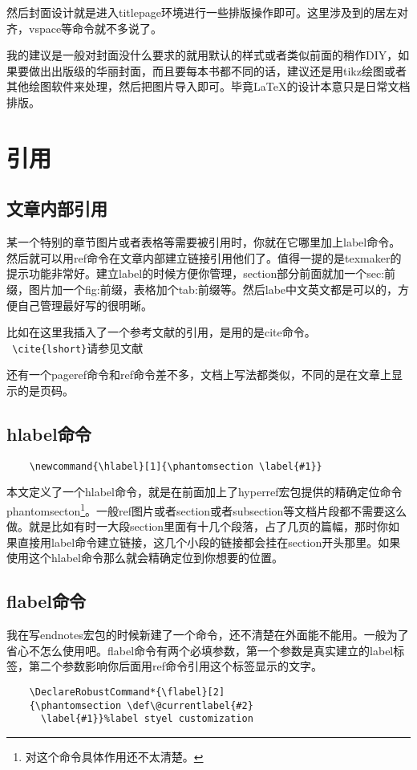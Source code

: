 \documentclass[11pt,oneside]{book}
\begin{document}
  然后封面设计就是进入titlepage环境进行一些排版操作即可。这里涉及到的居左对齐，vspace等命令就不多说了。

  我的建议是一般对封面没什么要求的就用默认的样式或者类似前面的稍作DIY，如果要做出出版级的华丽封面，而且要每本书都不同的话，建议还是用tikz绘图或者其他绘图软件来处理，然后把图片导入即可。毕竟\LaTeX 的设计本意只是日常文档排版。





  \chapter{引用}
  \section{文章内部引用}
  某一个特别的章节图片或者表格等需要被引用时，你就在它哪里加上label命令。然后就可以用ref命令在文章内部建立链接引用他们了。值得一提的是texmaker的提示功能非常好。建立label的时候方便你管理，section部分前面就加一个sec:前缀，图片加一个fig:前缀，表格加个tab:前缀等。然后labe中文英文都是可以的，方便自己管理最好写的很明晰。

  比如在这里我插入了一个参考文献的引用，是用的是cite命令。\\
  \verb+ \cite{lshort}+请参见文献\cite{lshort}

  还有一个pageref命令和ref命令差不多，文档上写法都类似，不同的是在文章上显示的是页码。

  \section{hlabel命令}
  \begin{Verbatim}
    \newcommand{\hlabel}[1]{\phantomsection \label{#1}}
  \end{Verbatim}

  本文定义了一个hlabel命令，就是在前面加上了hyperref宏包提供的精确定位命令phantomsecton\footnote{对这个命令具体作用还不太清楚。}。一般ref图片或者section或者subsection等文档片段都不需要这么做。就是比如有时一大段section里面有十几个段落，占了几页的篇幅，那时你如果直接用label命令建立链接，这几个小段的链接都会挂在section开头那里。如果使用这个hlabel命令那么就会精确定位到你想要的位置。


  \section{flabel命令}
  我在写endnotes宏包的时候新建了一个命令，还不清楚在外面能不能用。一般为了省心不怎么使用吧。flabel命令有两个必填参数，第一个参数是真实建立的label标签，第二个参数影响你后面用ref命令引用这个标签显示的文字。
  \begin{Verbatim}
    \DeclareRobustCommand*{\flabel}[2]
    {\phantomsection \def\@currentlabel{#2}
      \label{#1}}%label styel customization
  \end{Verbatim}
\end{document}
